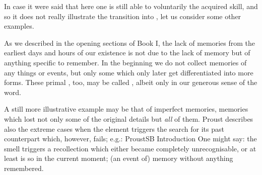 In case it were said that here one is still able to voluntarily  the
acquired skill, and so it does not really illustrate the transition into
, let us consider some other examples. 

As we described in the opening sections of Book I, the lack of memories from the
earliest days and hours of our existence is not due to the lack of memory but of
anything specific to remember.  In the beginning we do not collect memories of
any  things or events, but only some   which only later
get differentiated into more  forms. These primal , too, may
be called , albeit only in our generous sense of the word.

A still more illustrative example may be that of imperfect memories, memories
which lost not only some of the original details but {\em all} of them.  Proust
describes also the extreme cases when the  element triggers the
search for its past counterpart which, however, fails; e.g.: \citet{[...] I
  sensed the smell of the cherries on the table and nothing else. [...] I could
  not, however, choose anything from the confused, known and forgotten
  impressions; eventually, after a short while, I ceased seeing anything and my
  memory for ever immersed itself in sleep.}{ProustSB}{
  Introduction} One might say: the smell triggers a recollection
which either became completely unrecognisable, or at least is so in the current
moment; (an event of) memory without anything remembered.
  
